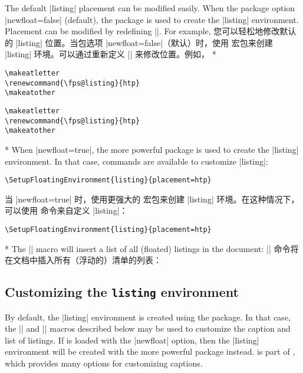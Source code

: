 \begin{paracol}{2}
The default |listing| placement can be modified easily.  When the package option |newfloat=false| (default), the  package is used to create the |listing| environment.  Placement can be modified by redefining |\fps@listing|.  For example,
\switchcolumn
您可以轻松地修改默认的 |listing| 位置。当包选项 |newfloat=false|（默认）时，使用  宏包来创建 |listing| 环境。可以通过重新定义 |\fps@listing| 来修改位置。例如，
\switchcolumn[0]*%
\begin{verbatim}
\makeatletter
\renewcommand{\fps@listing}{htp}
\makeatother
\end{verbatim}
\switchcolumn
\begin{verbatim}
\makeatletter
\renewcommand{\fps@listing}{htp}
\makeatother
\end{verbatim}
\switchcolumn[0]*%
When |newfloat=true|, the more powerful  package is used to create the |listing| environment.  In that case,  commands are available to customize |listing|:
\begin{verbatim}
\SetupFloatingEnvironment{listing}{placement=htp}
\end{verbatim}
\switchcolumn
当 |newfloat=true| 时，使用更强大的  宏包来创建 |listing| 环境。在这种情况下，可以使用  命令来自定义 |listing|：
\begin{verbatim}
\SetupFloatingEnvironment{listing}{placement=htp}
\end{verbatim}
\switchcolumn[0]*%
\DescribeMacro{\listoflistings}
The |\listoflistings| macro will insert a list of all (floated) listings in the document:
\switchcolumn
\DescribeMacro{\listoflistings}
|\listoflistings| 命令将在文档中插入所有（浮动的）清单的列表：
\end{paracol}

\begin{example}
    \listoflistings
\end{example}



\subsection*{Customizing the \texttt{listing} environment}
By default, the |listing| environment is created using the  package.  In that case, the |\listingscaption| and |\listoflistingscaption| macros described below may be used to customize the caption and list of listings.  If  is loaded with the |newfloat| option, then the |listing| environment will be created with the more powerful \href{http://www.ctan.org/pkg/newfloat}{} package instead.   is part of \href{http://www.ctan.org/pkg/caption}{}, which provides many options for customizing captions.

